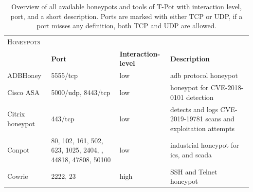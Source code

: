 \begin{table}
    \centering
    \caption[Overview honeypots of T-Pot]{Overview of all available honeypots and tools of T-Pot with interaction level, port, and a short description. Ports are marked with either TCP or UDP, if a port misses any definition, both TCP and UDP are allowed.}
    \begin{tabularx}{\linewidth}{l|XlX}
        \toprule
        \textsc{Honeypots}                        & \multicolumn{3}{c}{}                                                                                                                                                                                                            \\
                                                  & \textbf{Port}                                                                                               & \textbf{Interaction-level} & \textbf{Description}                                                                 \\
        \hline
        ADBHoney \cite{adbhoney2021}              & 5555/tcp                                                                                                    & low                        & \ac{adb} protocol honeypot                                                           \\
        Cisco ASA \cite{cymmetria2018}            & 5000/udp, 8443/tcp                                                                                          & low                        & honeypot for CVE-2018-0101\cite{CVE-2018-0101} detection                             \\
        Citrix honeypot \cite{citrixhoneypot2020} & 443/tcp                                                                                                     & low                        & detects and logs CVE-2019-19781\cite{CVE-2019-19781} scans and exploitation attempts \\
        Conpot \cite{conpot2021}                  & 80, 102, 161, 502, 623, 1025, 2404, \newline 10001, 44818, 47808, 50100                                     & low                        & industrial honeypot for \ac{ics}, and \ac{scada}                                     \\
        Cowrie \cite{cowire2021}                  & 2222, 23                                                                                                    & high                       & SSH and Telnet honeypot                                                              \\

\end{tabularx}
\end{table}
